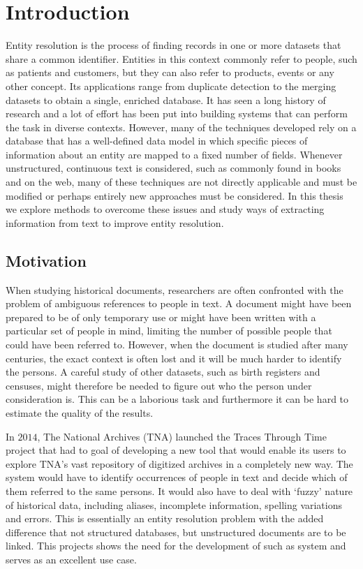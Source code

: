 \chapter{Introduction}
\label{ch:introduction}

Entity resolution is the process of finding records in one or more datasets that share a common identifier.
Entities in this context commonly refer to people, such as patients and customers, but they can also refer to products, events or any other concept.
Its applications range from duplicate detection to the merging datasets to obtain a single, enriched database.
It has seen a long history of research and a lot of effort has been put into building systems that can perform the task in diverse contexts.
However, many of the techniques developed rely on a database that has a well-defined data model in which specific pieces of information about an entity are mapped to a fixed number of fields.
Whenever unstructured, continuous text is considered, such as commonly found in books and on the web, many of these techniques are not directly applicable and must be modified or perhaps entirely new approaches must be considered.
In this thesis we explore methods to overcome these issues and study ways of extracting information from text to improve entity resolution.




\section{Motivation}
\label{sec:motivation}

When studying historical documents, researchers are often confronted with the problem of ambiguous references to people in text.
A document might have been prepared to be of only temporary use or might have been written with a particular set of people in mind, limiting the number of possible people that could have been referred to.
However, when the document is studied after many centuries, the exact context is often lost and it will be much harder to identify the persons.
A careful study of other datasets, such as birth registers and censuses, might therefore be needed to figure out who the person under consideration is.
This can be a laborious task and furthermore it can be hard to estimate the quality of the results.

In $2014$, The National Archives (TNA) launched the Traces Through Time project that had to goal of developing a new tool that would enable its users to explore TNA's vast repository of digitized archives in a completely new way.
The system would have to identify occurrences of people in text and decide which of them referred to the same persons.
It would also have to deal with `fuzzy' nature of historical data, including aliases, incomplete information, spelling variations and errors.
This is essentially an entity resolution problem with the added difference that not structured databases, but unstructured documents are to be linked.
This projects shows the need for the development of such as system and serves as an excellent use case.

